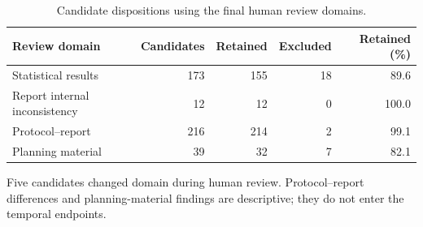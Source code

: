 \begin{table}[tbp]
\centering\small
\caption{Candidate dispositions using the final human review domains.}
\label{tab:dispositions}
\begin{tabular}{lrrrr}
\toprule
Review domain & Candidates & Retained & Excluded & Retained (\%) \\
\midrule
Statistical results & 173 & 155 & 18 & 89.6 \\
Report internal inconsistency & 12 & 12 & 0 & 100.0 \\
Protocol--report & 216 & 214 & 2 & 99.1 \\
Planning material & 39 & 32 & 7 & 82.1 \\
\bottomrule
\end{tabular}
\par\vspace{4pt}\begin{minipage}{0.97\linewidth}\footnotesize Five candidates changed domain during human review. Protocol--report differences and planning-material findings are descriptive; they do not enter the temporal endpoints.\end{minipage}
\end{table}
